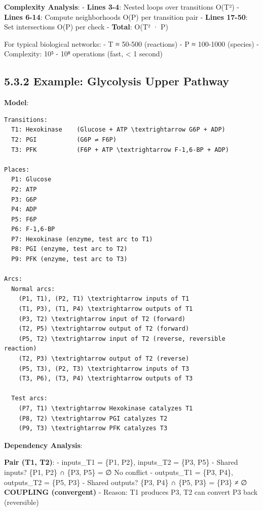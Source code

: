 \textbf{Complexity Analysis}: - \textbf{Lines 3-4}: Nested loops over
transitions \textrightarrow O(\textbar T\textbar²) - \textbf{Lines 6-14}: Compute
neighborhoods \textrightarrow O(\textbar P\textbar) per transition pair -
\textbf{Lines 17-50}: Set intersections \textrightarrow O(\textbar P\textbar) per
check - \textbf{Total}: O(\textbar T\textbar² · \textbar P\textbar)

For typical biological networks: - \textbar T\textbar{} ≈ 50-500
(reactions) - \textbar P\textbar{} ≈ 100-1000 (species) - Complexity:
10⁵ - 10⁸ operations (fast, \textless{} 1 second)

\hypertarget{example-glycolysis-upper-pathway}{%
\subsection{5.3.2 Example: Glycolysis Upper
Pathway}\label{example-glycolysis-upper-pathway}}

\textbf{Model}:

\begin{lstlisting}
Transitions:
  T1: Hexokinase    (Glucose + ATP \textrightarrow G6P + ADP)
  T2: PGI           (G6P ⇌ F6P)
  T3: PFK           (F6P + ATP \textrightarrow F-1,6-BP + ADP)

Places:
  P1: Glucose
  P2: ATP
  P3: G6P
  P4: ADP
  P5: F6P
  P6: F-1,6-BP
  P7: Hexokinase (enzyme, test arc to T1)
  P8: PGI (enzyme, test arc to T2)
  P9: PFK (enzyme, test arc to T3)

Arcs:
  Normal arcs:
    (P1, T1), (P2, T1) \textrightarrow inputs of T1
    (T1, P3), (T1, P4) \textrightarrow outputs of T1
    (P3, T2) \textrightarrow input of T2 (forward)
    (T2, P5) \textrightarrow output of T2 (forward)
    (P5, T2) \textrightarrow input of T2 (reverse, reversible reaction)
    (T2, P3) \textrightarrow output of T2 (reverse)
    (P5, T3), (P2, T3) \textrightarrow inputs of T3
    (T3, P6), (T3, P4) \textrightarrow outputs of T3
  
  Test arcs:
    (P7, T1) \textrightarrow Hexokinase catalyzes T1
    (P8, T2) \textrightarrow PGI catalyzes T2
    (P9, T3) \textrightarrow PFK catalyzes T3
\end{lstlisting}

\textbf{Dependency Analysis}:

\textbf{Pair (T1, T2)}: - inputs\_T1 = \{P1, P2\}, inputs\_T2 = \{P3,
P5\} - Shared inputs? \{P1, P2\} ∩ \{P3, P5\} = ∅ \textrightarrow No conflict -
outputs\_T1 = \{P3, P4\}, outputs\_T2 = \{P5, P3\} - Shared outputs?
\{P3, P4\} ∩ \{P5, P3\} = \{P3\} ≠ ∅ \textrightarrow \textbf{COUPLING (convergent)} -
Reason: T1 produces P3, T2 can convert P3 back (reversible)

